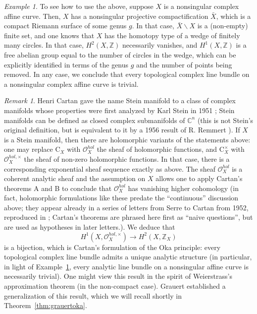 \documentclass[11pt,leqno]{article}
\newcommand{\cplx}{{\mathbb C}}
\newcommand{\C}{{\mathrm C}}
\newcommand{\Z}{{\mathbb Z}}
\renewcommand{\1}{{\rm 1\hspace*{-0.4ex}%
\rule{0.1ex}{1.52ex}\hspace*{0.2ex}}}
\newcommand{\<}[1]{{\langle}#1 {\rangle}}
\renewcommand{\setminus}{\smallsetminus}
\theoremstyle{plain}
\theoremstyle{definition}
\theoremstyle{remark}
\newtheorem{rem}[theorem]{Remark}
\newtheorem{ex}[theorem]{Example}
\numberwithin{equation}{subsection}
\begin{document}
\begin{ex}
	\label{ex:toplinebundlesoncurves}
	To see how to use the above, suppose $X$ is a nonsingular complex affine curve. Then, $X$ has a nonsingular projective compactification $\bar{X}$, which is a compact Riemann surface of some genus $g$.  In that case, $\bar{X} \setminus X$ is a (non-empty) finite set, and one knows that $X$ has the homotopy type of a wedge of finitely many circles.  In that case, $H^2(X,\Z)$ necessarily vanishes, and $H^1(X,\Z)$ is a free abelian group equal to the number of circles in the wedge, which can be explicitly identified in terms of the genus $g$ and the number of points being removed.  In any case, we conclude that every topological complex line bundle on a nonsingular complex affine curve is trivial. 
\end{ex}

\begin{rem}
	\label{rem:CartanOka}
	Henri Cartan gave the name Stein manifold to a class of complex manifolds whose properties were first analyzed by Karl Stein in 1951 \cite{Stein1951}; Stein manifolds can be defined as closed complex submanifolds of $\cplx^n$ (this is not Stein's original definition, but is equivalent to it by a 1956 result of R. Remmert \cite{Remmert1956CRAS}).  If $X$ is a Stein manifold, then there are holomorphic variants of the statements above: one may replace $\C_X$ with $\mathscr{O}^{hol}_X$ the sheaf of holomorphic functions, and $\C_X^{\times}$ with $\mathscr{O}^{hol,\times}_X$ the sheaf of non-zero holomorphic functions.  In that case, there is a corresponding exponential sheaf sequence exactly as above.  The sheaf $\mathscr{O}^{hol}_X$ is a coherent analytic sheaf and the assumption on $X$ allows one to apply Cartan's theorems A and B \cite{CartanBruxelles} to conclude that $\mathscr{O}^{hol}_X$ has vanishing higher cohomology (in fact, holomorphic formulations like these predate the ``continuous'' discussion above; they appear already in a series of letters from Serre to Cartan from 1952, reproduced in \cite{Serre1991PetitsCousins}; Cartan's theorems are phrased here first as  ``naive questions'', but are used as hypotheses in later letters.).  We deduce that
	\[
	H^1(X,\mathscr{O}^{hol,\times}_X) \longrightarrow H^2(X,\Z_X)
	\]
	is a bijection, which is Cartan's formulation of the Oka principle: every topological complex line bundle admits a unique analytic structure (in particular, in light of Example~\ref{ex:toplinebundlesoncurves}, every analytic line bundle on a nonsingular affine curve is necessarily trivial).  One might view this result in the spirit of Weierstrass's approximation theorem (in the non-compact case). Grauert established a generalization of this result, which we will recall shortly in Theorem~\ref{thm:grauertoka}. 
\end{rem}
\end{document}
